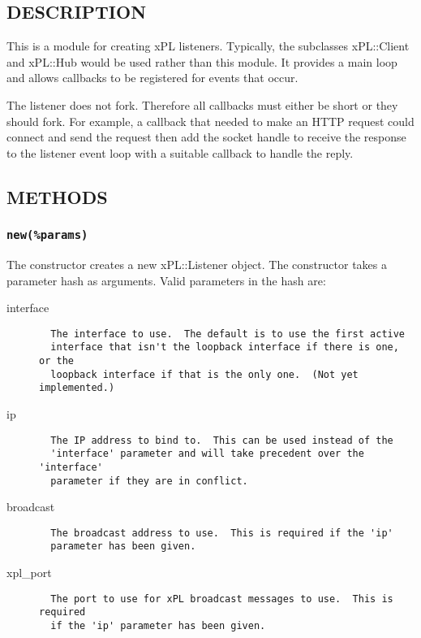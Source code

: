 \subsection*{DESCRIPTION\label{xPL::Listener_DESCRIPTION}}


This is a module for creating xPL listeners.  Typically, the
subclasses xPL::Client and xPL::Hub would be used rather than this
module.  It provides a main loop and allows callbacks to be registered
for events that occur.



The listener does not fork.  Therefore all callbacks must either be
short or they should fork.  For example, a callback that needed to
make an HTTP request could connect and send the request then add the
socket handle to receive the response to the listener event loop with a
suitable callback to handle the reply.

\subsection*{METHODS\label{xPL::Listener_METHODS}}
\subsubsection*{\texttt{new(\%params)}\label{xPL::Listener_new_params_}}


The constructor creates a new xPL::Listener object.  The constructor
takes a parameter hash as arguments.  Valid parameters in the hash
are:

\begin{description}

\item[{interface}] \mbox{}\begin{verbatim}
  The interface to use.  The default is to use the first active
  interface that isn't the loopback interface if there is one, or the
  loopback interface if that is the only one.  (Not yet implemented.)
\end{verbatim}

\item[{ip}] \mbox{}\begin{verbatim}
  The IP address to bind to.  This can be used instead of the
  'interface' parameter and will take precedent over the 'interface'
  parameter if they are in conflict.
\end{verbatim}

\item[{broadcast}] \mbox{}\begin{verbatim}
  The broadcast address to use.  This is required if the 'ip'
  parameter has been given.
\end{verbatim}

\item[{xpl\_port}] \mbox{}\begin{verbatim}
  The port to use for xPL broadcast messages to use.  This is required
  if the 'ip' parameter has been given.
\end{verbatim}
\end{description}


